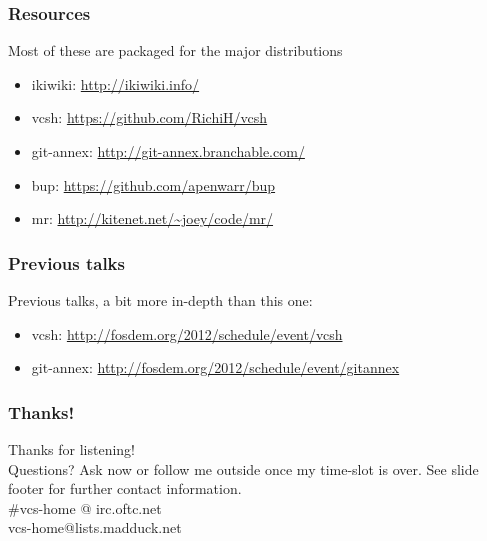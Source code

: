 \documentclass[t]{beamer}
\begin{document}
\begin{frame}
	\frametitle{Resources}
	Most of these are packaged for the major distributions
	\begin{itemize}
		\item ikiwiki: \url{http://ikiwiki.info/}
		\item vcsh: \url{https://github.com/RichiH/vcsh}
		\item git-annex: \url{http://git-annex.branchable.com/}
		\item bup: \url{https://github.com/apenwarr/bup}
		\item mr: \url{http://kitenet.net/~joey/code/mr/}
	\end{itemize}
\end{frame}

\begin{frame}
	\frametitle{Previous talks}
	Previous talks, a bit more in-depth than this one:
	\begin{itemize}
		\item vcsh: \url{http://fosdem.org/2012/schedule/event/vcsh}
		\item git-annex: \url{http://fosdem.org/2012/schedule/event/gitannex}
	\end{itemize}
\end{frame}


\begin{frame}
	\frametitle{Thanks!}
		\begin{center}
			\vfill
			Thanks for listening!\\
			\vfill
			Questions? Ask now or follow me outside once my time-slot is over.
			\vfill
			See slide footer for further contact information.\\
			\vfill
			\#vcs-home @ irc.oftc.net\\
			vcs-home@lists.madduck.net
			\vfill
		\end{center}
\end{frame}
\end{document}
